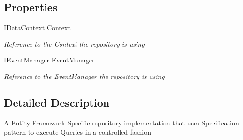 \subsection*{Properties}
\begin{DoxyCompactItemize}
\item 
\hyperlink{interface_highway_1_1_data_1_1_interfaces_1_1_i_data_context}{I\-Data\-Context} \hyperlink{class_highway_1_1_data_1_1_entity_framework_1_1_repositories_1_1_entity_framework_repository_a39447e7deb1284fc5e5d9ea7c2c78c63}{Context}
\begin{DoxyCompactList}\small\item\em Reference to the Context the repository is using \end{DoxyCompactList}\item 
\hyperlink{interface_highway_1_1_data_1_1_interfaces_1_1_i_event_manager}{I\-Event\-Manager} \hyperlink{class_highway_1_1_data_1_1_entity_framework_1_1_repositories_1_1_entity_framework_repository_abb629b7ba44c32a78951f64554f52e06}{Event\-Manager}
\begin{DoxyCompactList}\small\item\em Reference to the Event\-Manager the repository is using \end{DoxyCompactList}\end{DoxyCompactItemize}


\subsection{Detailed Description}
A Entity Framework Specific repository implementation that uses Specification pattern to execute Queries in a controlled fashion. 




